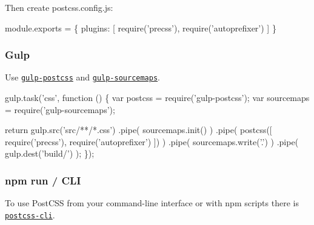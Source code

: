 

Then create {\ttfamily postcss.\+config.\+js}\+:


\begin{DoxyCode}
module.exports = \{
    plugins: [
        require('precss'),
        require('autoprefixer')
    ]
\}
\end{DoxyCode}


\subsubsection*{Gulp}

Use \href{https://github.com/postcss/gulp-postcss}{\tt {\ttfamily gulp-\/postcss}} and \href{https://github.com/floridoo/gulp-sourcemaps}{\tt {\ttfamily gulp-\/sourcemaps}}.


\begin{DoxyCode}
gulp.task('css', function () \{
    var postcss    = require('gulp-postcss');
    var sourcemaps = require('gulp-sourcemaps');

    return gulp.src('src/**/*.css')
        .pipe( sourcemaps.init() )
        .pipe( postcss([ require('precss'), require('autoprefixer') ]) )
        .pipe( sourcemaps.write('.') )
        .pipe( gulp.dest('build/') );
\});
\end{DoxyCode}


\subsubsection*{npm run / C\+LI}

To use Post\+C\+SS from your command-\/line interface or with npm scripts there is \href{https://github.com/postcss/postcss-cli}{\tt {\ttfamily postcss-\/cli}}.



